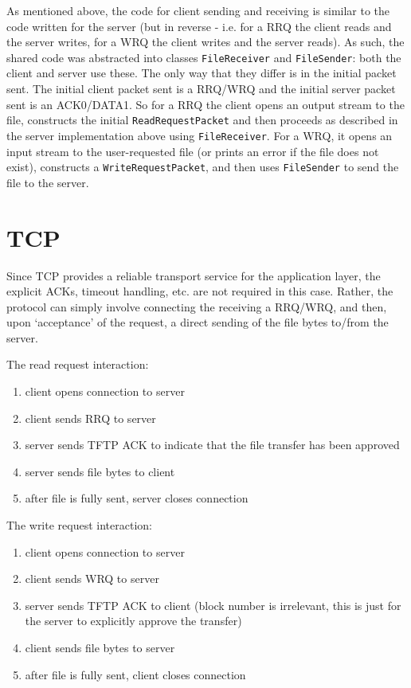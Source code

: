 \documentclass[a4paper]{article}
\newcommand{\code}{\texttt}
\begin{document}
As mentioned above, the code for client sending and receiving is similar to the code written for the server (but in reverse - i.e. for a RRQ the client reads and the server writes, for a WRQ the client writes and the server reads). As such, the shared code was abstracted into classes \code{FileReceiver} and \code{FileSender}: both the client and server use these. The only way that they differ is in the initial packet sent. The initial client packet sent is a RRQ/WRQ and the initial server packet sent is an ACK0/DATA1. So for a RRQ the client opens an output stream to the file, constructs the initial \code{ReadRequestPacket} and then proceeds as described in the server implementation above using \code{FileReceiver}. For a WRQ, it opens an input stream to the user-requested file (or prints an error if the file does not exist), constructs a \code{WriteRequestPacket}, and then uses \code{FileSender} to send the file to the server.
 
\section{TCP}

Since TCP provides a reliable transport service for the application layer, the explicit ACKs, timeout handling, etc. are not required in this case. Rather, the protocol can simply involve connecting the receiving a RRQ/WRQ, and then, upon `acceptance' of the request, a direct sending of the file bytes to/from the server. 

\begin{minipage}[t]{.5\textwidth}
The read request interaction:
\begin{enumerate}
\item client opens connection to server
\item client sends RRQ to server
\item server sends TFTP ACK to indicate that the file transfer has been approved
\item server sends file bytes to client
\item after file is fully sent, server closes connection 
\end{enumerate}
\end{minipage}%
\begin{minipage}[t]{.5\textwidth}
The write request interaction:
\begin{enumerate}
\item client opens connection to server
\item client sends WRQ to server
\item server sends TFTP ACK to client (block number is irrelevant, this is just for the server to explicitly approve the transfer)
\item client sends file bytes to server
\item after file is fully sent, client closes connection
\end{enumerate}
\end{minipage}
\end{document}
